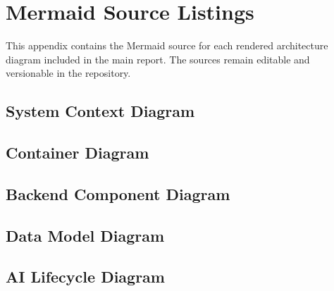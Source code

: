 \section{Mermaid Source Listings}\label{app:mermaid}

This appendix contains the Mermaid source for each rendered architecture diagram included in the main report. The sources remain editable and versionable in the repository.

\subsection{System Context Diagram}


\subsection{Container Diagram}


\subsection{Backend Component Diagram}


\subsection{Data Model Diagram}


\subsection{AI Lifecycle Diagram}

